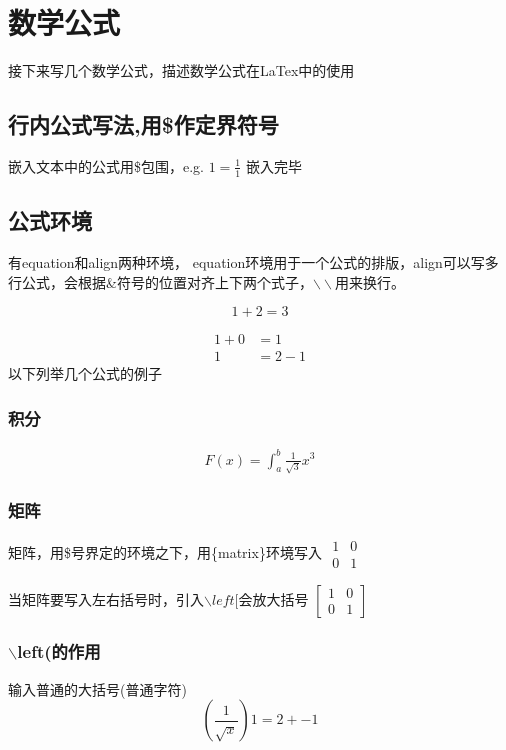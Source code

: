 \section{数学公式}
接下来写几个数学公式，描述数学公式在LaTex中的使用
\subsection{行内公式写法,用\$作定界符号}
嵌入文本中的公式用\$包围，e.g. $1=\frac{1}{1}$ 嵌入完毕
\subsection{公式环境}
有equation和align两种环境， equation环境用于一个公式的排版，align可以写多行公式，会根据\&符号的位置对齐上下两个式子，$\backslash\backslash$用来换行。

\begin{equation}
1+2=3
\end{equation}

\begin{align}
1+0 &=1\\
1&=2-1
\end{align}
以下列举几个公式的例子\\
\subsubsection{积分}
\begin{align}
F(x)=\int_a^b\frac{1}{\sqrt{3}}x^3
\end{align}
\subsubsection{矩阵}
矩阵，用\$号界定的环境之下，用\{matrix\}环境写入
$
\begin{matrix}                                      
1 & 0\\
0 & 1
\end{matrix}
$

当矩阵要写入左右括号时，引入$\backslash left[$会放大括号
$\left[
\begin{matrix}
1 & 0\\
0 & 1
\end{matrix}
\right]
$
\subsubsection{$\backslash$left(的作用}
输入普通的大括号(普通字符)
\begin{equation}
(\frac{1}{\sqrt{x}}) 
1=2+-1
\end{equation}

